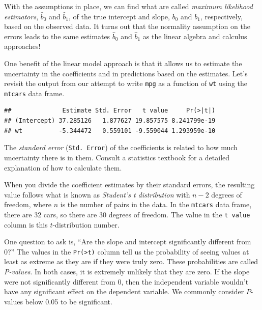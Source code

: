 \documentclass[
]{book}
\newenvironment{Shaded}{\begin{snugshade}}{\end{snugshade}}
\newcommand{\AttributeTok}[1]{\textcolor[rgb]{0.13,0.29,0.53}{#1}}
\newcommand{\FunctionTok}[1]{\textcolor[rgb]{0.13,0.29,0.53}{\textbf{#1}}}
\newcommand{\NormalTok}[1]{#1}
\newcommand{\OtherTok}[1]{\textcolor[rgb]{0.56,0.35,0.01}{#1}}
\newcommand{\SpecialCharTok}[1]{\textcolor[rgb]{0.81,0.36,0.00}{\textbf{#1}}}
\theoremstyle{definition}
\theoremstyle{definition}
\theoremstyle{definition}
\theoremstyle{definition}
\theoremstyle{remark}
\begin{document}
With the assumptions in place, we can find what are called \emph{maximum likelihood estimators}, \(\hat{b}_0\) and \(\hat{b}_1\), of the true intercept and slope, \(b_0\) and \(b_1\), respectively, based on the observed data. It turns out that the normality assumption on the errors leads to the same estimates \(\hat{b}_0\) and \(\hat{b}_1\) as the linear algebra and calculus approaches!

One benefit of the linear model approach is that it allows us to estimate the uncertainty in the coefficients and in predictions based on the estimates. Let's revisit the output from our attempt to write \texttt{mpg} as a function of \texttt{wt} using the \texttt{mtcars} data frame.

\begin{Shaded}
\end{Shaded}

\begin{verbatim}
##              Estimate Std. Error   t value     Pr(>|t|)
## (Intercept) 37.285126   1.877627 19.857575 8.241799e-19
## wt          -5.344472   0.559101 -9.559044 1.293959e-10
\end{verbatim}

The \emph{standard error} (\texttt{Std.\ Error}) of the coefficients is related to how much uncertainty there is in them. Consult a statistics textbook \autocite{OA,Navidi} for a detailed explanation of how to calculate them.

When you divide the coefficient estimates by their standard errors, the resulting value follows what is known as \emph{Student's t distribution} with \(n-2\) degrees of freedom, where \(n\) is the number of pairs in the data. In the \texttt{mtcars} data frame, there are 32 cars, so there are 30 degrees of freedom. The value in the \texttt{t\ value} column is this \(t\)-distribution number.

One question to ask is, ``Are the slope and intercept significantly different from 0?'' The values in the \texttt{Pr(\textgreater{}\textbar{}t\textbar{})} column tell us the probability of seeing values at least as extreme as they are if they were truly zero. These probabilities are called \emph{P-values}. In both cases, it is extremely unlikely that they are zero. If the slope were not significantly different from 0, then the independent variable wouldn't have any significant effect on the dependent variable. We commonly consider \(P\)-values below 0.05 to be significant.
\end{document}
